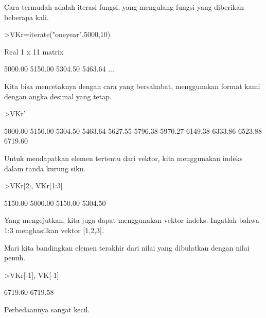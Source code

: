 \documentclass[a4paper,10pt]{article}
\begin{document}
\begin{eulernotebook}
\begin{eulercomment}
Cara termudah adalah iterasi fungsi, yang mengulang fungsi yang
diberikan beberapa kali.
\end{eulercomment}
\begin{eulerprompt}
>VKr=iterate("oneyear",5000,10)
\end{eulerprompt}
\begin{euleroutput}
  Real 1 x 11 matrix
  
      5000.00     5150.00     5304.50     5463.64     ...
\end{euleroutput}
\begin{eulercomment}
Kita bisa mencetaknya dengan cara yang bersahabat, menggunakan format
kami dengan angka desimal yang tetap.
\end{eulercomment}
\begin{eulerprompt}
>VKr'
\end{eulerprompt}
\begin{euleroutput}
      5000.00 
      5150.00 
      5304.50 
      5463.64 
      5627.55 
      5796.38 
      5970.27 
      6149.38 
      6333.86 
      6523.88 
      6719.60 
\end{euleroutput}
\begin{eulercomment}
Untuk mendapatkan elemen tertentu dari vektor, kita menggunakan indeks
dalam tanda kurung siku.
\end{eulercomment}
\begin{eulerprompt}
>VKr[2], VKr[1:3]
\end{eulerprompt}
\begin{euleroutput}
      5150.00 
      5000.00     5150.00     5304.50 
\end{euleroutput}
\begin{eulercomment}
Yang mengejutkan, kita juga dapat menggunakan vektor indeks. Ingatlah
bahwa 1:3 menghasilkan vektor [1,2,3].

Mari kita bandingkan elemen terakhir dari nilai yang dibulatkan dengan
nilai penuh.
\end{eulercomment}
\begin{eulerprompt}
>VKr[-1], VK[-1]
\end{eulerprompt}
\begin{euleroutput}
      6719.60 
      6719.58 
\end{euleroutput}
\begin{eulercomment}
Perbedaannya sangat kecil.


\end{eulercomment}
\end{eulernotebook}
\end{document}
